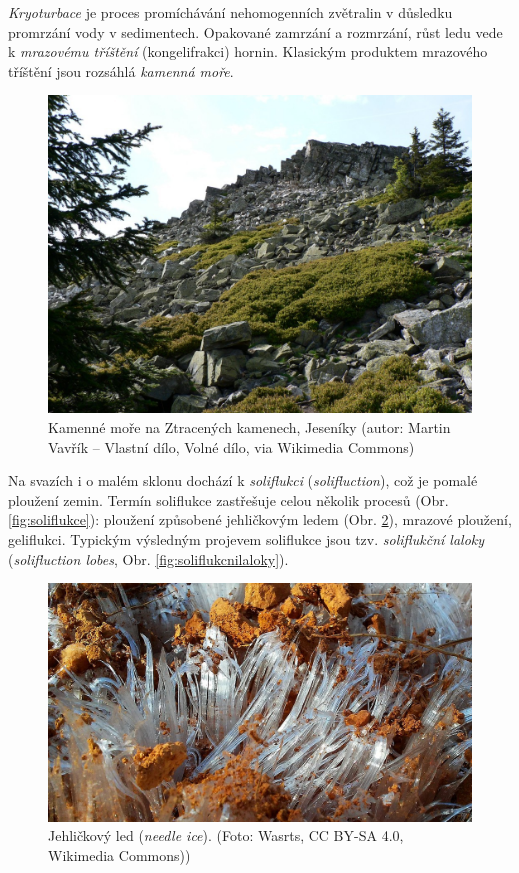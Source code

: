 \emph{Kryoturbace} je proces promíchávání nehomogenních zvětralin v důsledku promrzání vody v sedimentech. 
Opakované zamrzání a rozmrzání, růst ledu vede k \emph{mrazovému tříštění} (kongelifrakci) hornin. Klasickým produktem mrazového tříštění jsou rozsáhlá \emph{kamenná moře}. 

\begin{figure}[h]
	\centering
	\includegraphics[width=1\linewidth]{obrazky/periglac/kamenne_more}
	\caption{Kamenné moře na Ztracených kamenech, Jeseníky (autor: Martin Vavřík – Vlastní dílo, Volné dílo, via Wikimedia Commons)}
	\label{fig:kamennemore}
\end{figure}

Na svazích i o malém sklonu dochází k \emph{soliflukci} (\textit{solifluction}), což je pomalé ploužení zemin. Termín soliflukce zastřešuje celou několik procesů (Obr. \ref{fig:soliflukce}): ploužení způsobené jehličkovým ledem (Obr. \ref{fig:jehlickovyled}), mrazové ploužení, geliflukci. Typickým výsledným projevem soliflukce jsou tzv. \emph{soliflukční laloky} (\textit{solifluction lobes}, Obr. \ref{fig:soliflukcnilaloky}).

\begin{figure}[h]
	\centering
	\includegraphics[width=1\linewidth]{obrazky/periglac/jehlickovy_led}
	\caption{Jehličkový led (\textit{needle ice}). (Foto: Wasrts, CC BY-SA 4.0, Wikimedia Commons))}
	\label{fig:jehlickovyled}
\end{figure}

